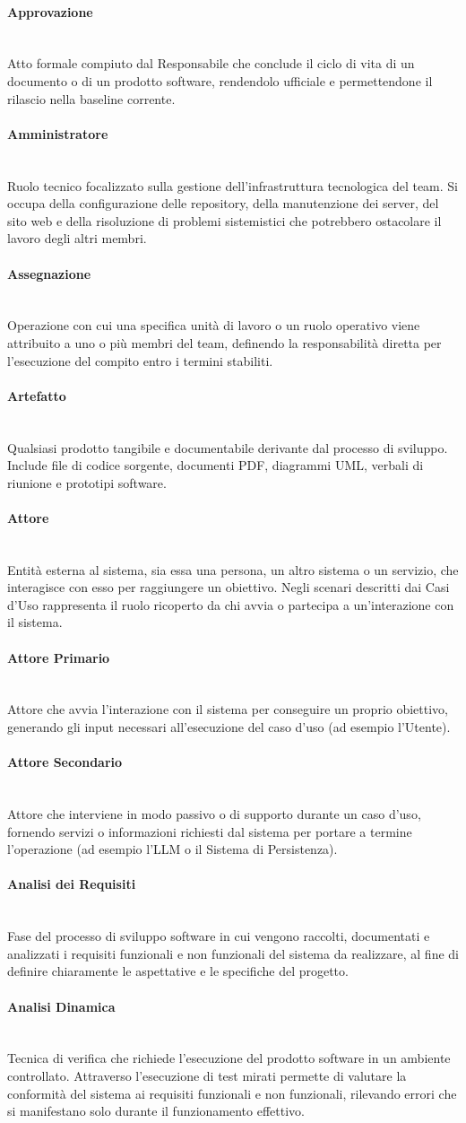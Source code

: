 \documentclass[a4paper, 10pt, colorlinks=true, linkcolor=black, urlcolor=blue, citecolor=blue, hidelinks]{article}
\newcommand{\glossaryterm}[2]{
    \paragraph{#1 \label{term:#1}} \mbox{} \\
    #2
    \vspace{0.5em}
}
\begin{document}
\glossaryterm{Approvazione}{Atto formale compiuto dal Responsabile che conclude il ciclo di vita di un documento o di un prodotto software, rendendolo ufficiale e permettendone il rilascio nella baseline corrente.}

\glossaryterm{Amministratore}{Ruolo tecnico focalizzato sulla gestione dell'infrastruttura tecnologica del team. Si occupa della configurazione delle repository, della manutenzione dei server, del sito web e della risoluzione di problemi sistemistici che potrebbero ostacolare il lavoro degli altri membri.}

\glossaryterm{Assegnazione}{Operazione con cui una specifica unità di lavoro o un ruolo operativo viene attribuito a uno o più membri del team, definendo la responsabilità diretta per l'esecuzione del compito entro i termini stabiliti.}

\glossaryterm{Artefatto}{Qualsiasi prodotto tangibile e documentabile derivante dal processo di sviluppo. Include file di codice sorgente, documenti PDF, diagrammi UML, verbali di riunione e prototipi software.}

\glossaryterm{Attore}{Entità esterna al sistema, sia essa una persona, un altro sistema o un servizio, che interagisce con esso per raggiungere un obiettivo. Negli scenari descritti dai Casi d'Uso rappresenta il ruolo ricoperto da chi avvia o partecipa a un'interazione con il sistema.}

\glossaryterm{Attore Primario}{Attore che avvia l'interazione con il sistema per conseguire un proprio obiettivo, generando gli input necessari all'esecuzione del caso d'uso (ad esempio l'Utente).}

\glossaryterm{Attore Secondario}{Attore che interviene in modo passivo o di supporto durante un caso d'uso, fornendo servizi o informazioni richiesti dal sistema per portare a termine l'operazione (ad esempio l'LLM o il Sistema di Persistenza).}

\glossaryterm{Analisi dei Requisiti}{Fase del processo di sviluppo software in cui vengono raccolti, documentati e analizzati i requisiti funzionali e non funzionali del sistema da realizzare, al fine di definire chiaramente le aspettative e le specifiche del progetto.}

\glossaryterm{Analisi Dinamica}{Tecnica di verifica che richiede l'esecuzione del prodotto software in un ambiente controllato. Attraverso l'esecuzione di test mirati permette di valutare la conformità del sistema ai requisiti funzionali e non funzionali, rilevando errori che si manifestano solo durante il funzionamento effettivo.}
\end{document}
